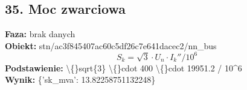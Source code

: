 ﻿\documentclass[11pt]{article}
\begin{document}
\subsection*{35. Moc zwarciowa}
\textbf{Faza:} brak danych\\
\textbf{Obiekt:} stn/ac3f845407ac60c5df26c7e641dacec2/nn\_bus\\
\[
S_k = \sqrt{3} \cdot U_n \cdot I_{k}'' / 10^6
\]
\textbf{Podstawienie:} \textbackslash\{\}sqrt\{3\} \textbackslash\{\}cdot 400 \textbackslash\{\}cdot 19951.2 / 10\textasciicircum{}6\\
\textbf{Wynik:} \{'sk\_mva': 13.82258751132248\}\\
\end{document}
